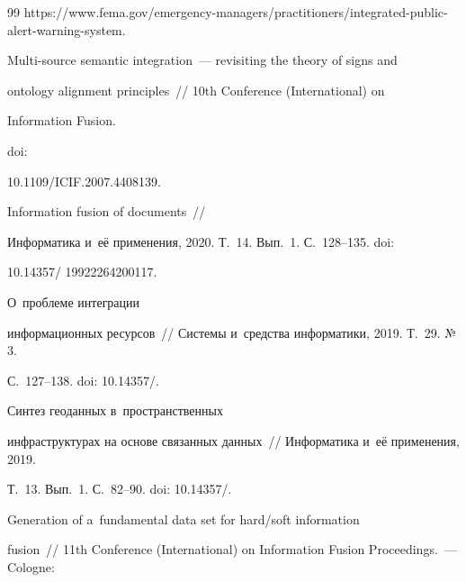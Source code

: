 {{\begin{thebibliography}{99}
{\sf https://www.fema.gov/\linebreak emergency-managers/practitioners/integrated-public-alert-warning-system}.




 Multi-source semantic integration~--- revisiting the theory of signs and 


ontology alignment principles~/\!\!/ 10th  Conference (International) on 


Information Fusion. 






 doi: 


10.1109\!/\!ICIF.2007.4408139.




 Information fusion of documents~/\!\!/ 


Информатика и~её применения, 2020. Т.~14. Вып.~1. С.~128--135. doi: 


10.14357\!/ 19922264200117.







 О~проб\-ле\-ме интеграции 


информационных ресурсов~/\!\!/ Сис\-те\-мы и~средства информатики, 2019. Т.~29. №\,3. 


С.~127--138. doi: 10.14357\!/.







 Синтез геоданных в~пространственных 


инфраструктурах на основе связанных данных~/\!\!/ Информатика и~её применения, 2019. 


Т.~13. Вып.~1. С.~82--90. doi: 10.14357\!/.







 Generation of a~fundamental data set for hard\!/\!soft information 


fusion~/\!\!/ 11th  Conference  (International) on Information Fusion Proceedings.~--- Cologne: 



\end{thebibliography}}}
